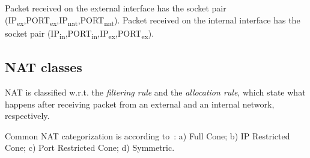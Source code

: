 \documentclass{llncs}
\begin{document}
Packet received on the external interface has the socket pair {(IP\textsubscript{ex},PORT\textsubscript{ex},IP\textsubscript{nat},PORT\textsubscript{nat})}.
Packet received on the internal interface has the socket pair {(IP\textsubscript{in},PORT\textsubscript{in},IP\textsubscript{ex},PORT\textsubscript{ex})}.

% 
% 

\subsection{NAT classes}\label{sec:nat}
NAT is classified w.r.t. the \emph{filtering rule} and the \emph{allocation rule}, which state what happens after receiving
packet from an external and an internal network, respectively.

Common NAT categorization is according to~\citep{rfc3489}: a) Full Cone;
b) IP Restricted Cone; c) Port Restricted Cone; d) Symmetric.
\end{document}
